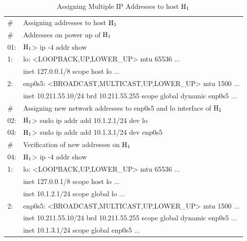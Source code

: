 \begin{table}[H]
\caption{Assigning Multiple IP Addresses to host ${\rm H}_{1}$}\label{chap2-table-4}
\begin{center}
\begin{tabular}{|l@{\;}l|}
\hline
\# & Assigning addresses to host ${\rm H}_{1}$\\
\# & Addresses on power up of ${\rm H}_{1}$\\
01:& ${\rm H}_{1}$> ip -4 addr show\\
1: & lo: <LOOPBACK,UP,LOWER\_UP> mtu 65536 $\ldots$\\
   & \quad inet 127.0.0.1/8 scope host lo $\ldots$\\
2: & enp0s5: <BROADCAST,MULTICAST,UP,LOWER\_UP> mtu 1500 $\ldots$\\
   & \quad inet 10.211.55.10/24 brd 10.211.55.255 scope global dynamic enp0s5 $\ldots$\\
   \hline
\# & Assigning new network addresses to enp0s5 and lo interface of ${\rm H}_{1}$\\
02:& ${\rm H}_{1}$> sudo ip addr add 10.1.2.1/24 dev lo\\
03:& ${\rm H}_{1}$> sudo ip addr add 10.1.3.1/24 dev enp0s5\\
\hline
\# & Verification of new addresses on ${\rm H}_{1}$\\
04:& ${\rm H}_{1}$> ip -4 addr show\\
1: & lo: <LOOPBACK,UP,LOWER\_UP> mtu 65536 $\ldots$\\
   &\quad inet 127.0.0.1/8 scope host lo $\ldots$\\
   & \quad inet 10.1.2.1/24 scope global lo $\ldots$\\
2: & enp0s5: <BROADCAST,MULTICAST,UP,LOWER\_UP> mtu 1500 $\ldots$\\
   & \quad inet 10.211.55.10/24 brd 10.211.55.255 scope global dynamic enp0s5 $\ldots$\\
   &\quad inet 10.1.3.1/24 scope global enp0s5 $\ldots$\\
   \hline   
\end{tabular}
\end{center}
\end{table}

\vspace{-1.9cm}

